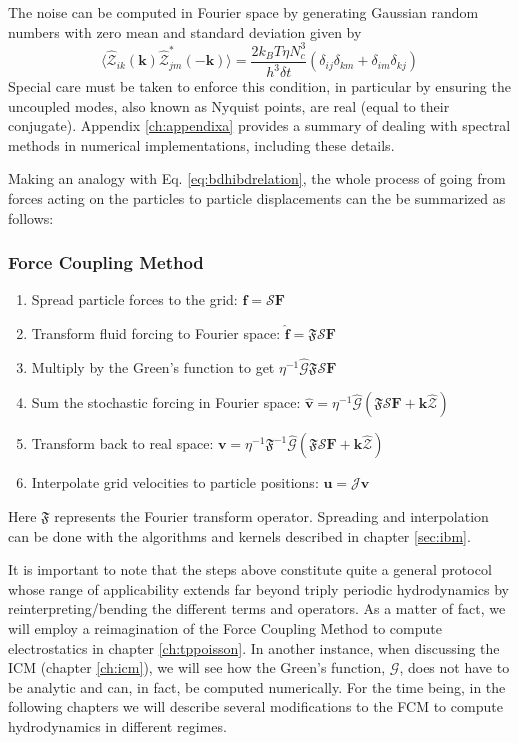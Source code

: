 \documentclass[ twoside,openright,titlepage,numbers=noenddot,%
headinclude,footinclude,cleardoublepage=empty,abstract=on,
BCOR=5mm,paper=b5,fontsize=11pt, dvipsnames
]{scrreprt}
\renewcommand{\vec}[1]{\bm{#1}}
\newcommand{\tens}[1]{\bm{\mathcal{#1}}}
\newcommand{\oper}[1]{\mathcal{#1}}
\newcommand{\dt}{\delta t}
\newcommand{\kT}{k_B T}
\newcommand{\fou}[1]{\widehat{#1}}
\newcommand{\pvel}{u}
\newcommand{\fvel}{v}
\begin{document}
The noise can be computed in Fourier space by generating Gaussian random numbers with zero mean and standard deviation given by
\begin{equation}
  \langle \fou{\mathcal{Z}}_{ik}(\vec{k})\fou{\mathcal{Z}}^*_{jm} (-\vec{k})\rangle = \frac{2\kT\eta N_c^3}{ h^3 \dt}(\delta_{ij}\delta_{km} + \delta_{im}\delta_{kj})
\end{equation}
Special care must be taken to enforce this condition, in particular by ensuring the uncoupled modes, also known as Nyquist points, are real (equal to their conjugate). Appendix \ref{ch:appendixa} provides a summary of dealing with spectral methods in numerical implementations, including these details.

Making an analogy with Eq. \eqref{eq:bdhibdrelation}, the whole process of going from forces acting on the particles to particle displacements can the be summarized as follows:
\subsubsection*{Force Coupling Method}
\begin{enumerate}
\item Spread particle forces to the grid: $\vec{f} = \oper{S}\vec{F}$
\item Transform fluid forcing to Fourier space: $\fou{\vec{f}} = \mathfrak{F}\oper{S}\vec{F}$
\item Multiply by the Green's function to get $\eta^{-1}\fou{\tens{G}}\mathfrak{F}\oper{S}\vec{F}$
\item Sum the stochastic forcing in Fourier space: $\fou{\vec{\fvel}} = \eta^{-1}\fou{\tens{G}}(\mathfrak{F}\oper{S}\vec{F} + \vec{k}\fou{\mathcal{Z}})$
\item Transform back to real space: $\vec{\fvel} = \eta^{-1}\mathfrak{F}^{-1}\fou{\tens{G}}(\mathfrak{F}\oper{S}\vec{F} + \vec{k}\fou{\mathcal{Z}})$
\item Interpolate grid velocities to particle positions: $\vec{\pvel} = \oper{J}\vec{\fvel}$
\end{enumerate}
Here $\mathfrak{F}$ represents the Fourier transform operator.
Spreading and interpolation can be done with the algorithms and kernels described in chapter \ref{sec:ibm}. 

It is important to note that the steps above constitute quite a general protocol whose range of applicability extends far beyond triply periodic hydrodynamics by reinterpreting/bending the different terms and operators. As a matter of fact, we will employ a reimagination of the Force Coupling Method to compute electrostatics in chapter \ref{ch:tppoisson}. In another instance, when discussing the \gls{ICM} (chapter \ref{ch:icm}), we will see how the Green's function, $\tens{G}$, does not have to be analytic and can, in fact, be computed numerically. For the time being, in the following chapters we will describe several modifications to the \gls{FCM} to compute hydrodynamics in different regimes.
\end{document}
